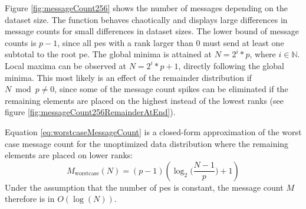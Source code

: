 Figure \ref{fig:messageCount256} shows the number of messages depending on the dataset size.
The function behaves chaotically and displays large differences in message counts for small differences in dataset sizes.
The lower bound of message counts is $p - 1$, since all \glspl{pe} with a rank larger than $0$ must send at least one subtotal to the root \gls{pe}.
The global minima is attained at $N = 2^i * p$, where $i \in \mathbb{N}$.
Local maxima can be observed at $N = 2^i * p + 1$, directly following the global minima.
This most likely is an effect of the remainder distribution if $N \bmod p \neq 0$, since some of the message count spikes can be eliminated if the remaining elements are placed on the highest instead of the lowest ranks (see figure \ref{fig:messageCount256RemainderAtEnd}).

Equation \eqref{eq:worstcaseMessageCount} is a closed-form approximation of the worst case message count for the unoptimized data distribution where the remaining elements are placed on lower ranks:
\begin{equation}
\label{eq:worstcaseMessageCount}
M_{\textrm{worstcase}}(N) = (p - 1) (\log_2 \Big( \frac{N - 1}{p} \Big) + 1)
\end{equation}
Under the assumption that the number of \glspl{pe} is constant, the message count $M$ therefore is in $O(\log(N))$.